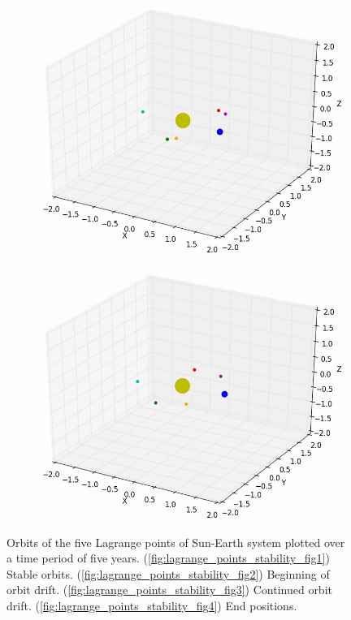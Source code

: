 \documentclass[10pt,letterpaper]{article}
\begin{document}
\begin{figure}[!htb]
  \includegraphics[width=\linewidth]{figures/lagrange_points/lagrange_points_stability_3.png}
  \subcaption{}\label{fig:lagrange_points_stability_fig3}
\endminipage
{}%
  \includegraphics[width=\linewidth]{figures/lagrange_points/lagrange_points_stability_4.png}
  \subcaption{}\label{fig:lagrange_points_stability_fig4}
\endminipage
\caption{Orbits of the five Lagrange points of Sun-Earth system plotted over a time period of five years.
(\ref{fig:lagrange_points_stability_fig1}) Stable orbits. 
(\ref{fig:lagrange_points_stability_fig2}) Beginning of orbit drift. 
(\ref{fig:lagrange_points_stability_fig3}) Continued orbit drift. 
(\ref{fig:lagrange_points_stability_fig4}) End positions.}\label{fig:lagrange_points_stability}
\end{figure}
\end{document}
